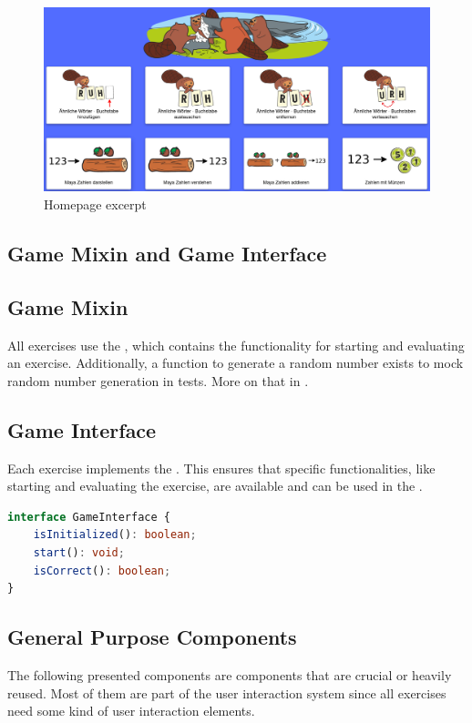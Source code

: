 \begin{figure}[h]
    \centering
    \includegraphics[width=1.0 \columnwidth]{figures/homepage.png}
    \caption{Homepage excerpt} 
    \label{fig:homepage} 
\end{figure}

\subsection{Game Mixin and Game Interface}

\subsection*{Game Mixin}
\label{subsection:gameMixin}
All exercises use the , which contains the functionality for starting and evaluating an exercise. Additionally, a function to generate a random number exists to mock random number generation in tests. More on that in .

\subsection*{Game Interface}
Each exercise implements the . This ensures that specific functionalities, like starting and evaluating the exercise, are available and can be used in the .

\begin{lstlisting}[language=TypeScript,caption={GameInterface},label={lst:gameInterface}]
interface GameInterface {
    isInitialized(): boolean;
    start(): void;
    isCorrect(): boolean;
}
\end{lstlisting}

\subsection{General Purpose Components}
\label{subsection:generalPuprposeComponents}
The following presented components are components that are crucial or heavily reused. Most of them are part of the user interaction system since all exercises need some kind of user interaction elements.

